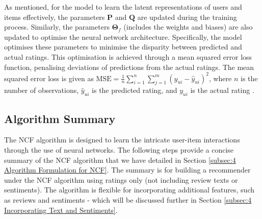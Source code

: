 As mentioned, for the model to learn the latent representations of users and items effectively, the parameters $\mathbf{P}$ and $\mathbf{Q}$ are updated during the training process. Similarly, the parameters $\boldsymbol{\Theta}_f$ (includes the weights and biases) are also updated to optimise the neural network architecture. Specifically, the  model optimises these parameters to minimise the disparity between predicted and actual ratings. This optimisation is achieved through a mean squared error loss function, penalising deviations of predictions from the actual ratings. The mean squared error loss is given as $\text{MSE} = \frac{1}{n} \sum_{i=1}^{n} \sum_{j=1}^{m} (y_{ui} - \hat{y}_{ui})^2$, where $n$ is the number of observations, $\hat{y}_{ui}$ is the predicted rating, and ${y}_{ui}$ is the actual rating \cite{he2017neural}.


\subsection{Algorithm Summary}
\label{subsec:4 Algorithm Summary}

The NCF algorithm is designed to learn the intricate user-item interactions through the use of neural networks. The following steps provide a concise summary of the NCF algorithm that we have detailed in Section \ref{subsec:4 Algorithm Formulation for NCF}. The summary is for building a recommender under the NCF algorithm using ratings only (not including review texts or sentiments). The algorithm is flexible for incorporating additional features, such as reviews and sentiments - which will be discussed further in Section \ref{subsec:4 Incorporating Text and Sentiments}.


